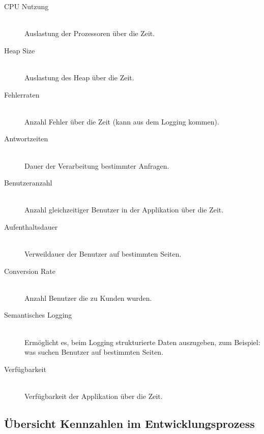 \begin{description}
  \item[CPU Nutzung] \hfill \\ Auslastung der Prozessoren über die Zeit.
  \item[Heap Size] \hfill \\ Auslastung des Heap über die Zeit.
  \item[Fehlerraten] \hfill \\ Anzahl Fehler über die Zeit (kann aus dem Logging kommen).
  \item[Antwortzeiten] \hfill \\ Dauer der Verarbeitung bestimmter Anfragen.
  \item[Benutzeranzahl] \hfill \\ Anzahl gleichzeitiger Benutzer in der Applikation über die Zeit.
  \item[Aufenthaltsdauer] \hfill \\ Verweildauer der Benutzer auf bestimmten Seiten.
  \item[Conversion Rate] \hfill \\ Anzahl Benutzer die zu Kunden wurden.
  \item[Semantisches Logging] \hfill \\ Ermöglicht es, beim Logging strukturierte Daten auszugeben, zum Beispiel: was suchen Benutzer auf bestimmten Seiten.
  \item[Verfügbarkeit] \hfill \\ Verfügbarkeit der Applikation über die Zeit.
\end{description}

\newpage
\subsection{Übersicht Kennzahlen im Entwicklungsprozess}

